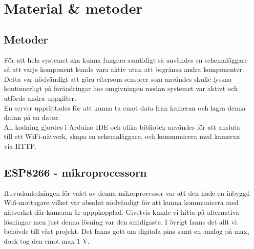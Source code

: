 

\chapter{Material \& metoder} %
\label{ch:metoder}


\ifpdf
    \graphicspath{{8/figures/PNG/}{8/figures/PDF/}{8/figures/}}
\else
    \graphicspath{{8/figures/EPS/}{8/figures/}}
\fi




\section{Metoder}
För att hela systemet ska kunna fungera samtidigt så användes en schemaläggare så att varje komponent kunde vara aktiv utan att begränsa andra komponenter. Detta var nödvändigt att göra eftersom sensorer som användes skulle lyssna kontinuerligt på förändringar hos omgivningen medan systemet var aktivt och utförde andra uppgifter.\\

En server upprättades för att kunna ta emot data från kameran och lagra denna datan på en dator.\\

All kodning gjordes i Arduino IDE och olika bibliotek användes för att ansluta till ett WiFi-nätverk, skapa en schemaläggare, och kommunicera med kameran via HTTP.\\ 

\section{ESP8266 - mikroprocessorn}
Huvudanledningen för valet av denna mikroprocessor var att den hade en inbyggd Wifi-mottagare vilket var absolut nödvändigt för att kunna kommunicera med nätverket där kameran är upppkopplad. Givetvis kunde vi hitta på alternativa lösningar men just denna lösning var den smidigaste. I övrigt fanns det allt vi behövde till vårt projekt. Det fanns gott om digitala pins samt en analog på max, dock tog den emot max 1 V. \\

